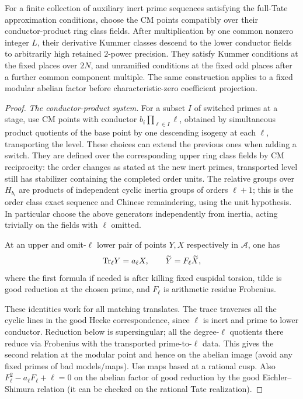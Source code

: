 \begin{lemma}\label{split-local:descent}
For a finite collection of auxiliary inert prime sequences satisfying the full-Tate approximation conditions, choose the CM points compatibly over their conductor-product ring class fields. After multiplication by one common nonzero integer \(L\), their derivative Kummer classes descend to the lower conductor fields to arbitrarily high retained \(2\)-power precision. They satisfy Kummer conditions at the fixed places over \(2N\), and unramified conditions at the fixed odd places after a further common component multiple. The same construction applies to a fixed modular abelian factor before characteristic-zero coefficient projection.
\end{lemma}

\begin{proof}
\smallskip\noindent\emph{The conductor-product system.}
For a subset \(I\) of switched primes at a stage, use CM points with conductor \(b_i\prod_{\ell\in I}\ell\), obtained by simultaneous product quotients of the base point by one descending isogeny at each \(\ell\), transporting the level. These choices can extend the previous ones when adding a switch. They are defined over the corresponding upper ring class fields by CM reciprocity: the order changes as stated at the new inert primes, transported level still has stabilizer containing the completed order units. The relative groups over \(H_{b_i}\) are products of independent cyclic inertia groups of orders \(\ell+1\); this is the order class exact sequence and Chinese remaindering, using the unit hypothesis. In particular choose the above generators independently from inertia, acting trivially on the fields with \(\ell\) omitted.

At an upper and omit-\(\ell\) lower pair of points \(Y,X\) respectively in \(\mathcal A\), one has
\[
                 {\rm Tr}_\ell Y=a_\ell X,\qquad
                 \widetilde Y=F_\ell\widetilde X ,
\]
where the first formula if needed is after killing fixed cuspidal torsion, tilde is good reduction at the chosen prime, and \(F_\ell\) is arithmetic residue Frobenius.

These identities work for all matching translates. The trace traverses all the cyclic lines in the good Hecke correspondence, since \(\ell\) is inert and prime to lower conductor. Reduction below is supersingular; all the degree-\(\ell\) quotients there reduce via Frobenius with the transported prime-to-\(\ell\) data. This gives the second relation at the modular point and hence on the abelian image (avoid any fixed primes of bad models/maps). Use maps based at a rational cusp. Also \(F_\ell^2-a_\ell F_\ell+\ell=0\) on the abelian factor of good reduction by the good Eichler--Shimura relation (it can be checked on the rational Tate realization).


\end{proof}
